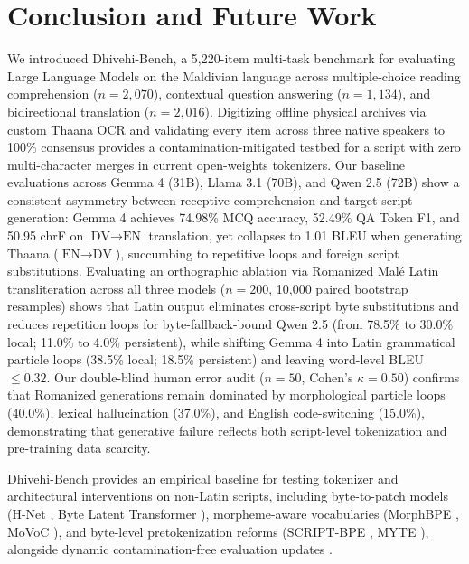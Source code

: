 \documentclass[acmsmall,review,anonymous]{acmart}
\begin{document}
\section{Conclusion and Future Work}
We introduced Dhivehi-Bench, a 5,220-item multi-task benchmark for evaluating Large Language Models on the Maldivian language across multiple-choice reading comprehension ($n=2,070$), contextual question answering ($n=1,134$), and bidirectional translation ($n=2,016$). Digitizing offline physical archives via custom Thaana OCR and validating every item across three native speakers to 100\% consensus provides a contamination-mitigated testbed for a script with zero multi-character merges in current open-weights tokenizers. Our baseline evaluations across Gemma 4 (31B), Llama 3.1 (70B), and Qwen 2.5 (72B) show a consistent asymmetry between receptive comprehension and target-script generation: Gemma 4 achieves 74.98\% MCQ accuracy, 52.49\% QA Token F1, and 50.95 chrF on $\text{DV}\rightarrow\text{EN}$ translation, yet collapses to 1.01 BLEU when generating Thaana ($\text{EN}\rightarrow\text{DV}$), succumbing to repetitive loops and foreign script substitutions. Evaluating an orthographic ablation via Romanized Mal\'{e} Latin transliteration across all three models ($n=200$, 10,000 paired bootstrap resamples) shows that Latin output eliminates cross-script byte substitutions and reduces repetition loops for byte-fallback-bound Qwen 2.5 (from 78.5\% to 30.0\% local; 11.0\% to 4.0\% persistent), while shifting Gemma 4 into Latin grammatical particle loops (38.5\% local; 18.5\% persistent) and leaving word-level BLEU $\leq 0.32$. Our double-blind human error audit ($n=50$, Cohen's $\kappa=0.50$) confirms that Romanized generations remain dominated by morphological particle loops (40.0\%), lexical hallucination (37.0\%), and English code-switching (15.0\%), demonstrating that generative failure reflects both script-level tokenization and pre-training data scarcity.

Dhivehi-Bench provides an empirical baseline for testing tokenizer and architectural interventions on non-Latin scripts, including byte-to-patch models (H-Net \cite{hwang_dynamic_2025}, Byte Latent Transformer \cite{pagnoni_byte_2025}), morpheme-aware vocabularies (MorphBPE \cite{asgari_morphbpe_2026}, MoVoC \cite{teklehaymanot_movoc_2025}), and byte-level pretokenization reforms (SCRIPT-BPE \cite{land_bpe_2025}, MYTE \cite{limisiewicz_myte_2024}), alongside dynamic contamination-free evaluation updates \cite{li_latesteval_2023, chen_benchmarking_2025}.
\end{document}
